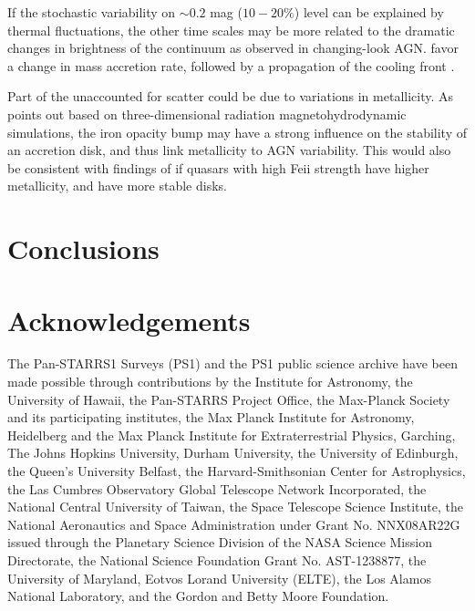 \documentclass[twocolumn]{aastex62}
\begin{document}
If  the  stochastic variability  on ${\sim} 0.2$ mag ($10-20\%$) level can be explained by thermal fluctuations, the other time scales may be more related to the dramatic changes in brightness of the continuum as observed in changing-look AGN. \citet{noda2018} favor a change in mass accretion rate, followed by a propagation of the cooling front \cite{lawrence2018, simm2016}.  

Part of the unaccounted for scatter could be due to variations in metallicity.  As \cite{jiang2016} points out based on three-dimensional radiation magnetohydrodynamic simulations, the iron opacity bump may have a strong influence on the stability of an accretion disk, and thus link metallicity to AGN variability. This would also be consistent with findings of \cite{sun2018} if quasars with high  Fe{\sc ii} strength have higher metallicity, and have more stable disks. 








\section{Conclusions}\label{sec:conclusions}

\section{Acknowledgements}
%
%
%
%
%
%

The Pan-STARRS1 Surveys (PS1) and the PS1 public science archive have been made possible through contributions by the Institute for Astronomy, the University of Hawaii, the Pan-STARRS Project Office, the Max-Planck Society and its participating institutes, the Max Planck Institute for Astronomy, Heidelberg and the Max Planck Institute for Extraterrestrial Physics, Garching, The Johns Hopkins University, Durham University, the University of Edinburgh, the Queen's University Belfast, the Harvard-Smithsonian Center for Astrophysics, the Las Cumbres Observatory Global Telescope Network Incorporated, the National Central University of Taiwan, the Space Telescope Science Institute, the National Aeronautics and Space Administration under Grant No. NNX08AR22G issued through the Planetary Science Division of the NASA Science Mission Directorate, the National Science Foundation Grant No. AST-1238877, the University of Maryland, Eotvos Lorand University (ELTE), the Los Alamos National Laboratory, and the Gordon and Betty Moore Foundation.
\end{document}
